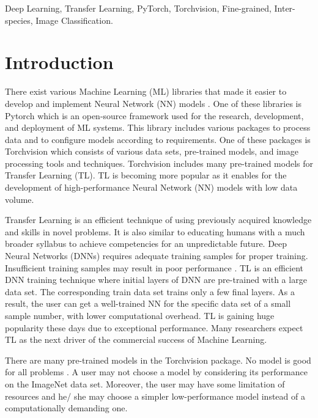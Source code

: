 \documentclass[conference]{IEEEtran}
\begin{document}
\begin{IEEEkeywords}
Deep Learning, Transfer Learning, PyTorch, Torchvision, Fine-grained, Inter-species, Image Classification.
\end{IEEEkeywords}




\IEEEpeerreviewmaketitle



\section{Introduction}
There exist various Machine Learning (ML) libraries that made it easier to develop and implement Neural Network (NN) models \cite{qazani2020prepositioning, hossain2017application}. One of these libraries is Pytorch\cite{paszke2019pytorch} which is an open-source framework used for the research, development, and deployment of ML systems. This library includes various packages to process data and to configure models according to requirements. One of these packages is Torchvision which consists of various data sets, pre-trained models, and image processing tools and techniques. Torchvision includes many pre-trained models for Transfer Learning (TL). TL is becoming more popular as it enables for the development of high-performance Neural Network (NN) models with low data volume.

Transfer Learning is an efficient technique of using previously acquired knowledge and skills in novel problems. It is also similar to educating humans with a much broader syllabus to achieve competencies for an unpredictable future. Deep Neural Networks (DNNs) requires adequate training samples for proper training. Insufficient training samples may result in poor performance \cite{kabir2018neural, qazani2020performance, kabir2021uncertainty}. TL is an efficient DNN training technique where initial layers of DNN are pre-trained with a large data set\cite{qazani2019model}. The corresponding train data set trains only a few final layers. As a result, the user can get a well-trained NN for the specific data set of a small sample number, with lower computational overhead. TL is gaining huge popularity these days due to exceptional performance. Many researchers expect TL as the next driver of the commercial success of Machine Learning.

There are many pre-trained models in the Torchvision package. No model is good for all problems \cite{asadi2019model}. A user may not choose a model by considering its performance on the ImageNet\cite{imagenet_cvpr09} data set. Moreover, the user may have some limitation of resources and he/ she may choose a simpler low-performance model instead of a computationally demanding one. 
\end{document}
